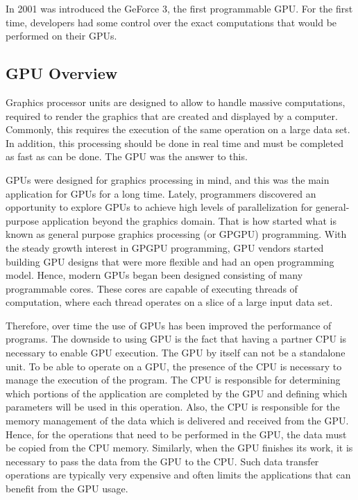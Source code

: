 \documentclass[Ingles]{ic-tese-v1}
\begin{document}
In 2001 was introduced the GeForce 3, the first programmable GPU.
For the first time, developers had some control over the exact computations
that would be performed on their GPUs.

\subsection{GPU Overview}
Graphics processor units are designed to allow to handle massive computations,
required to render the graphics that are created and displayed by a computer.
Commonly, this requires the execution of the same operation on a large data set.
In addition, this processing should be done in real time and must be completed as
fast as can be done. The GPU was the answer to this.

GPUs were designed for graphics processing in mind, and this was the main application
for GPUs for a long time. Lately, programmers discovered an opportunity
to explore GPUs to achieve high levels of parallelization for general-purpose
application beyond the graphics domain.  That is how started
what is known as general purpose graphics processing (or GPGPU) programming.
With the steady growth interest in GPGPU programming, GPU vendors
started building GPU designs that were more flexible and had an open
programming model. Hence, modern GPUs began been designed consisting of many
programmable cores. These cores are capable of executing
threads of computation, where each thread operates on a slice of
a large  input data set.

Therefore, over time the use of GPUs has been improved the performance of programs.
The downside to using GPU is
the fact that having a partner CPU is necessary to enable GPU execution.
The GPU by itself can not be a standalone unit. To be able to operate on a GPU, the presence of the CPU is
necessary to manage the execution of the program. The CPU is responsible for
determining which portions of the application are completed by the GPU and defining which
parameters will be used in this operation. Also,
the CPU is responsible for the memory management of the data which is
delivered and received from the GPU. Hence, for  the
operations that need to be performed in the GPU, the data must be copied from the CPU
memory. Similarly, when the GPU finishes its work, it is necessary to pass
the data from the GPU to the CPU. Such data transfer operations are typically  very expensive
and often limits the applications that can benefit from the GPU usage.
\end{document}
